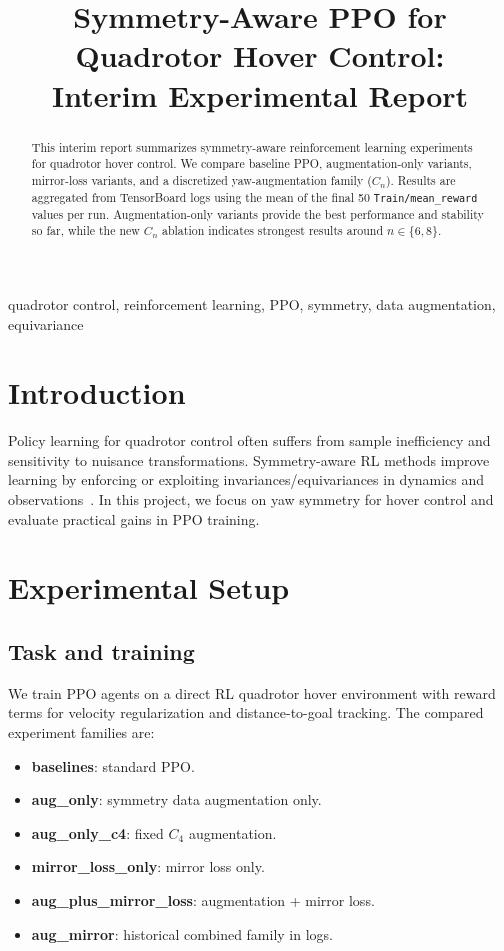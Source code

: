 \documentclass[conference]{IEEEtran}
\title{Symmetry-Aware PPO for Quadrotor Hover Control:\\Interim Experimental Report}
\author{\IEEEauthorblockN{SS26 Drone Control Team}
\IEEEauthorblockA{MetaRL Project}}
\begin{document}
\maketitle

\begin{abstract}
This interim report summarizes symmetry-aware reinforcement learning experiments for quadrotor hover control. We compare baseline PPO, augmentation-only variants, mirror-loss variants, and a discretized yaw-augmentation family ($C_n$). Results are aggregated from TensorBoard logs using the mean of the final 50 \texttt{Train/mean\_reward} values per run. Augmentation-only variants provide the best performance and stability so far, while the new $C_n$ ablation indicates strongest results around $n\in\{6,8\}$.
\end{abstract}

\begin{IEEEkeywords}
quadrotor control, reinforcement learning, PPO, symmetry, data augmentation, equivariance
\end{IEEEkeywords}

\section{Introduction}
Policy learning for quadrotor control often suffers from sample inefficiency and sensitivity to nuisance transformations. Symmetry-aware RL methods improve learning by enforcing or exploiting invariances/equivariances in dynamics and observations~\cite{mukhopadhyay2020survey,sanchez2023symmetric}. In this project, we focus on yaw symmetry for hover control and evaluate practical gains in PPO training.

\section{Experimental Setup}
\subsection{Task and training}
We train PPO agents on a direct RL quadrotor hover environment with reward terms for velocity regularization and distance-to-goal tracking. The compared experiment families are:
\begin{itemize}
    \item \textbf{baselines}: standard PPO.
    \item \textbf{aug\_only}: symmetry data augmentation only.
    \item \textbf{aug\_only\_c4}: fixed $C_4$ augmentation.
    \item \textbf{mirror\_loss\_only}: mirror loss only.
    \item \textbf{aug\_plus\_mirror\_loss}: augmentation + mirror loss.
    \item \textbf{aug\_mirror}: historical combined family in logs.
\end{itemize}
\end{document}
